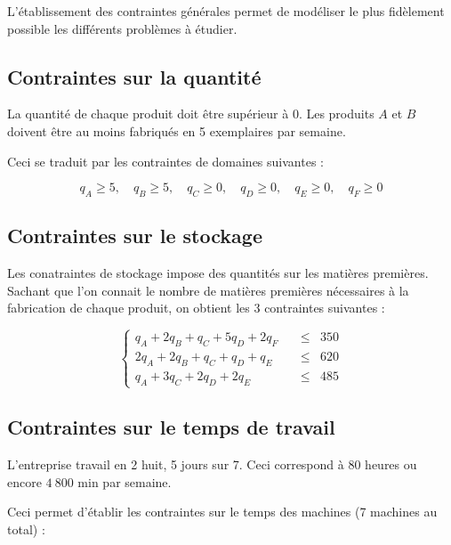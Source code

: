 \documentclass[paper=a4, fontsize=11pt]{report}
\numberwithin{equation}{section}		%
\numberwithin{figure}{section}			%
\numberwithin{table}{section}				%
\begin{document}
L'établissement des contraintes générales permet de modéliser le plus fidèlement possible les différents problèmes à étudier.

\subsection{Contraintes sur la quantité}

La quantité de chaque produit doit être supérieur à 0. Les produits $A$ et $B$ doivent être au moins fabriqués en 5 exemplaires par semaine.

Ceci se traduit par les contraintes de domaines suivantes : 

\begin{equation}
q_A \geq 5, \quad q_B \geq 5, \quad q_C \geq 0, \quad q_D \geq 0, \quad q_E \geq 0, \quad q_F \geq 0 
\label{ctr_quantite}
\end{equation} 

\subsection{Contraintes sur le stockage}
Les conatraintes de stockage impose des quantités sur les matières premières. Sachant que l'on connait le nombre de matières premières nécessaires à la fabrication de chaque produit, on obtient les 3 contraintes suivantes :  

\begin{equation}
  \left\{
    \begin{aligned}
q_A + 2 q_B + q_C + 5q_D + 2q_F \quad & \leq & 350 \\
2q_A + 2q_B + q_C + q_D + q_E \quad & \leq & 620 \\
q_A + 3 q_C + 2q_D + 2q_E \quad & \leq & 485 
    \end{aligned}
  \right.
\label{ctr_stockage}
\end{equation}

\subsection{Contraintes sur le temps de travail}

L'entreprise travail en 2 huit, 5 jours sur 7. Ceci correspond à 80 heures  ou encore $4\:800$ min par semaine.

Ceci permet d'établir les contraintes sur le temps des machines (7 machines au total) : 
\end{document}

